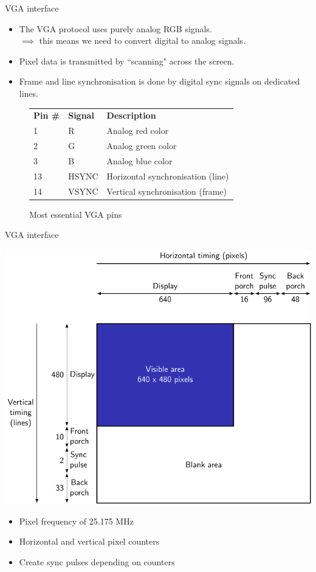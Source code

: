 \documentclass{beamer}
\begin{document}
\begin{frame}{VGA interface}
	\begin{itemize}
		\item The VGA protocol uses purely analog RGB signals.\\
		$\implies$ this means we need to convert digital 
		to analog signals.
	\item Pixel data is transmitted by ``scanning" 
		across the screen.
	\item Frame and line synchronisation is done 
		by digital sync signals on dedicated lines.
	\end{itemize}
	\begin{figure}
	\begin{tabular}{l|l|l}
		\textbf{Pin \#} & \textbf{Signal} & \textbf{Description}\\
		1			& R & Analog red color\\
		2			& G	& Analog green color\\
		3			& B & Analog blue color\\
		13		& HSYNC & Horizontal synchronisation (line)\\
		14		& VSYNC & Vertical synchronisation (frame)
	\end{tabular}
	\caption{Most essential VGA pins}
\end{figure}
\end{frame}

\begin{frame}{VGA interface}
	\begin{minipage}{0.66\textwidth}
	\includegraphics[width=\textwidth]{../figures/signals-figure0.pdf}
	\end{minipage}
	\begin{minipage}{0.32\textwidth}
		\begin{itemize}
			\item Pixel frequency of 25.175 MHz
			\item Horizontal and vertical pixel counters
			\item Create sync pulses depending on counters
		\end{itemize}
	\end{minipage}
\end{frame}
\end{document}
